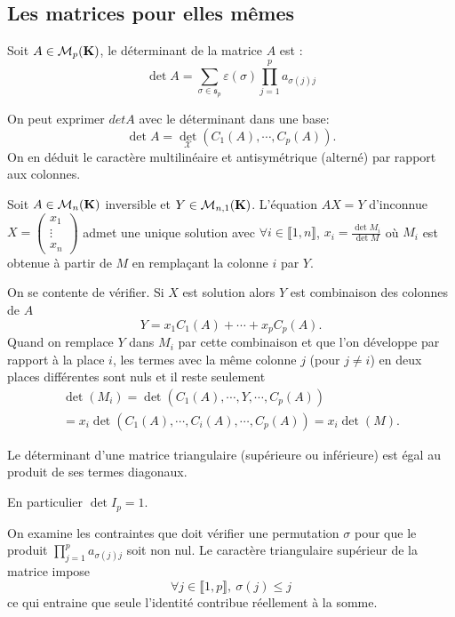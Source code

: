 \subsection{Les matrices pour elles mêmes}
\begin{defi}
 Soit $A\in\mathcal M_p(\mathbf{K})$, le déterminant de la matrice $A$ est :
\begin{displaymath}
 \det A =
\sum_{\sigma\in \mathfrak s_p}\varepsilon(\sigma)\prod_{j=1}^{p}a_{\sigma(j)j}
\end{displaymath}
\end{defi}
\begin{rem}
  On peut exprimer $det A$ avec le déterminant dans une base:
\[
  \det A= \det_\mathcal{X}(C_1(A), \cdots, C_p(A)).
\]
On en déduit le caractère multilinéaire et antisymétrique (alterné) par rapport aux colonnes.
\end{rem}
\newpage
{}
\begin{propn}
 Soit $A\in \mathcal{M}_n(\mathbf{K})$ inversible et $Y\in \mathcal{M}_{n,1}(\mathbf{K})$. L'équation $AX = Y$ d'inconnue $X= \begin{pmatrix}x_1 \\ \vdots \\x_n\end{pmatrix}$ admet une unique solution avec $\forall i \in \llbracket 1,n \rrbracket$, $x_i = \frac{\det M_i}{\det M}$ où $M_i$ est obtenue à partir de $M$ en remplaçant la colonne $i$ par $Y$.
\end{propn}
\begin{demo}
  On se contente de vérifier. Si $X$ est solution alors $Y$ est combinaison des colonnes de $A$
\[
  Y = x_1C_1(A) + \cdots + x_p C_p(A).
\]
Quand on remplace $Y$ dans $M_i$ par cette combinaison et que l'on développe par rapport à la place $i$, les termes avec la même colonne $j$ (pour $j \neq i$) en deux places différentes sont nuls et il reste seulement
\begin{multline*}
  \det(M_i) = \det(C_1(A),\cdots,Y,\cdots,C_p(A)) \\= x_i \det(C_1(A),\cdots,C_i(A),\cdots,C_p(A)) = x_i \det(M).
\end{multline*}
\end{demo}
\newpage
\begin{propn}
Le déterminant d'une matrice triangulaire (supérieure ou inférieure) est égal au produit de ses termes diagonaux.
\end{propn}
\begin{rem}
En particulier $\det I_p=1$.  
\end{rem}
\begin{demo}
  On examine les contraintes que doit vérifier une permutation $\sigma$ pour que le produit $\prod_{j=1}^{p}a_{\sigma(j)j}$ soit non nul. Le caractère triangulaire supérieur de la matrice impose
\[
  \forall j \in \llbracket 1, p \rrbracket, \: \sigma(j) \leq j
\]
ce qui entraine que seule l'identité contribue réellement à la somme.
\end{demo}

